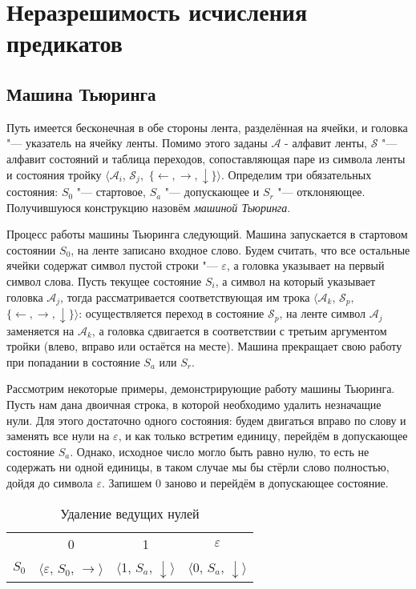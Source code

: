 \section{Неразрешимость исчисления предикатов}
\subsection{Машина Тьюринга}
\begin{definition} Путь имеется бесконечная в обе стороны лента,
разделённая на ячейки, и головка "--- указатель на ячейку ленты. Помимо этого заданы $\mathcal{A}$ -
алфавит ленты, $\mathcal{S}$ "--- алфавит состояний и таблица переходов, сопоставляющая паре из символа
ленты и состояния тройку $\langle\mathcal{A}_i$,  $\mathcal{S}_j,$  $\lbrace \leftarrow, \rightarrow,
\downarrow\rbrace\rangle$. Определим три обязательных состояния: $S_0$ "--- стартовое, $S_a$ "---
допускающее и $S_r$ "--- отклоняющее. Получившуюся конструкцию назовём \textit{машиной Тьюринга}.
\end{definition}

Процесс работы машины Тьюринга следующий. Машина запускается в стартовом состоянии $S_0$, на ленте
записано входное слово. Будем считать, что все остальные ячейки содержат символ пустой строки "---
$\varepsilon$, а головка указывает на первый символ слова. Пусть текущее состояние $S_i$, а символ на
который указывает головка $\mathcal{A}_j$, тогда рассматривается соответствующая им трока
$\langle\mathcal{A}_k$,  $\mathcal{S}_p,$  $\lbrace \leftarrow, \rightarrow, \downarrow \rbrace\rangle$:
осуществляется переход в состояние $\mathcal{S}_p$, на ленте символ $\mathcal{A}_j$ заменяется на
$\mathcal{A}_k$, а головка сдвигается в соответствии с третьим аргументом тройки (влево, вправо или
остаётся на месте). Машина прекращает свою работу при попадании в состояние $S_a$ или $S_r$.

Рассмотрим некоторые примеры, демонстрирующие работу машины Тьюринга. Пусть нам дана двоичная строка, в
которой необходимо удалить незначащие нули. Для этого достаточно одного состояния: будем двигаться вправо
по слову и заменять все нули на $\varepsilon$, и как только встретим единицу, перейдём в допускающее
состояние $S_a$. Однако, исходное число могло быть равно нулю, то есть не содержать ни одной единицы, в
таком случае мы бы стёрли слово полностью, дойдя до символа $\varepsilon$. Запишем 0 заново и перейдём в
допускающее состояние.

\begin{table}[h]
    \centering
    \begin{tabular}{c c c c}
        & 0 & 1 & $\varepsilon$ \\
        
        $S_0$ & 
        $\langle\varepsilon$, $S_0$, $\rightarrow\rangle$ & 
        $\langle$1, $S_a$, $\downarrow\rangle$ & 
        $\langle$0, $S_a$, $\downarrow\rangle$ \\
    \end{tabular}
    \caption[Пример ]{Удаление ведущих нулей}
\end{table}

